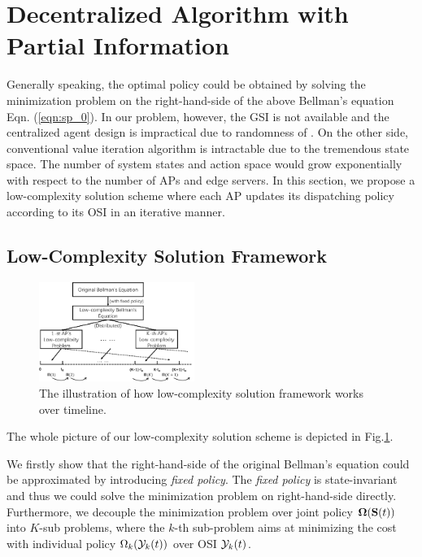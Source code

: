 \section{Decentralized Algorithm with Partial Information}
Generally speaking, the optimal policy could be obtained by solving the minimization problem on the right-hand-side of the above Bellman's equation Eqn. (\ref{eqn:sp_0}).
In our problem, however, the GSI is not available and the centralized agent design is impractical due to randomness of \brlatency.
On the other side, conventional value iteration algorithm is intractable due to the tremendous state space.
The number of system states and action space would grow exponentially with respect to the number of APs and edge servers.
In this section, we propose a low-complexity solution scheme where each AP updates its dispatching policy according to its OSI in an iterative manner.

\subsection{Low-Complexity Solution Framework}
\begin{figure}[htp!]
    \centering
    \includegraphics[width=0.45\textwidth]{images/solution-framework.pdf}
    \caption{The illustration of how low-complexity solution framework works over timeline.}
    \label{fig:solution}
\end{figure}
The whole picture of our low-complexity solution scheme is depicted in Fig.\ref{fig:solution}.

We firstly show that the right-hand-side of the original Bellman's equation could be approximated by introducing \emph{fixed policy}.
The \emph{fixed policy} is state-invariant and thus we could solve the minimization problem on right-hand-side directly.
Furthermore, we decouple the minimization problem over joint policy $\boldsymbol{\Omega}(\mathbf{S}(t))$ into $K$-sub problems, where the $k$-th sub-problem aims at minimizing the cost with individual policy $\Omega_{k}(\mathcal{Y}_{k}(t))$ over OSI $\mathcal{Y}_{k}(t)$.

